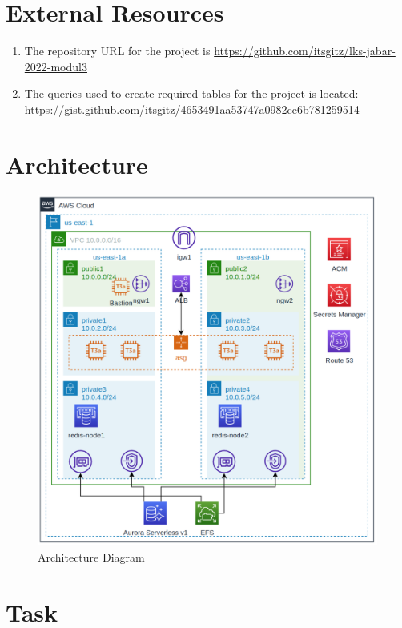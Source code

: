 \documentclass{article}
\begin{document}
\section{External Resources}\label{resources}
\begin{enumerate}
    \item The repository URL for the project is \href{https://github.com/itsgitz/lks-jabar-2022-modul3}{https://github.com/itsgitz/lks-jabar-2022-modul3}
    \item The queries used to create required tables for the project is located: \href{https://gist.github.com/itsgitz/4653491aa53747a0982ce6b781259514}{https://gist.github.com/itsgitz/4653491aa53747a0982ce6b781259514}
\end{enumerate}

\newpage

\section{Architecture}
\begin{figure}[h]
\centering
\includegraphics[width=\textwidth]{modul3_architecture.png}
\caption{\label{fig:architecture}Architecture Diagram}
\end{figure}

\section{Task}
\end{document}
